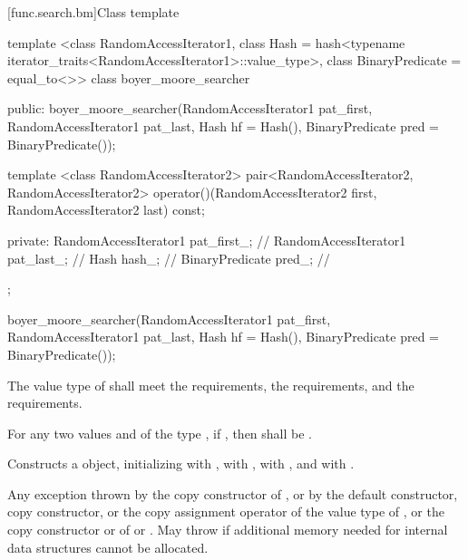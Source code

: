 [func.search.bm]{Class template }

%
\begin{codeblock}
template <class RandomAccessIterator1,
          class Hash = hash<typename iterator_traits<RandomAccessIterator1>::value_type>,
          class BinaryPredicate = equal_to<>>
  class boyer_moore_searcher {
  public:
    boyer_moore_searcher(RandomAccessIterator1 pat_first,
                         RandomAccessIterator1 pat_last,
                         Hash hf = Hash(),
                         BinaryPredicate pred = BinaryPredicate());

    template <class RandomAccessIterator2>
      pair<RandomAccessIterator2, RandomAccessIterator2>
        operator()(RandomAccessIterator2 first, RandomAccessIterator2 last) const;

  private:
    RandomAccessIterator1 pat_first_;   // \expos
    RandomAccessIterator1 pat_last_;    // \expos
    Hash hash_;                         // \expos
    BinaryPredicate pred_;              // \expos
  };
\end{codeblock}

%
\begin{itemdecl}
boyer_moore_searcher(RandomAccessIterator1 pat_first,
                     RandomAccessIterator1 pat_last,
                     Hash hf = Hash(),
                     BinaryPredicate pred = BinaryPredicate());
\end{itemdecl}

\begin{itemdescr}
\pnum
\requires
The value type of  shall meet the  requirements,
the  requirements, and the  requirements.

\pnum
\requires
For any two values  and  of the type ,
if , then  shall be .

\pnum
\effects
Constructs a  object, initializing  with ,
 with ,  with , and  with .

\pnum
\throws
Any exception thrown by the copy constructor of ,
or by the default constructor, copy constructor, or the copy assignment operator of the value type of ,
or the copy constructor or  of  or .
May throw  if additional memory needed for internal data structures cannot be allocated.
\end{itemdescr}

